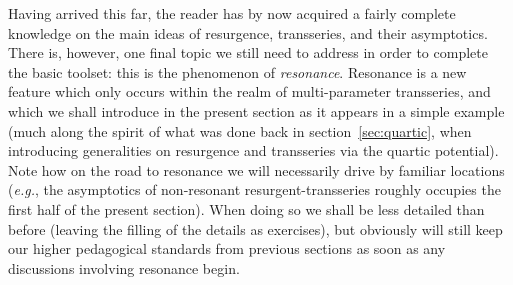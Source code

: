 \documentclass[11pt,a4paper]{article}
\begin{document}
Having arrived this far, the reader has by now acquired a fairly complete knowledge on the main ideas of resurgence, transseries, and their asymptotics. There is, however, one final topic we still need to address in order to complete the basic toolset: this is the phenomenon of \textit{resonance}. Resonance is a new feature which only occurs within the realm of multi-parameter transseries, and which we shall introduce in the present section as it appears in a simple example (much along the spirit of what was done back in section~\ref{sec:quartic}, when introducing generalities on resurgence and transseries via the quartic potential). Note how on the road to resonance we will necessarily drive by familiar locations (\textit{e.g.}, the asymptotics of non-resonant resurgent-transseries roughly occupies the first half of the present section). When doing so we shall be less detailed than before (leaving the filling of the details as exercises), but obviously will still keep our higher pedagogical standards from previous sections as soon as any discussions involving resonance begin.
\end{document}

